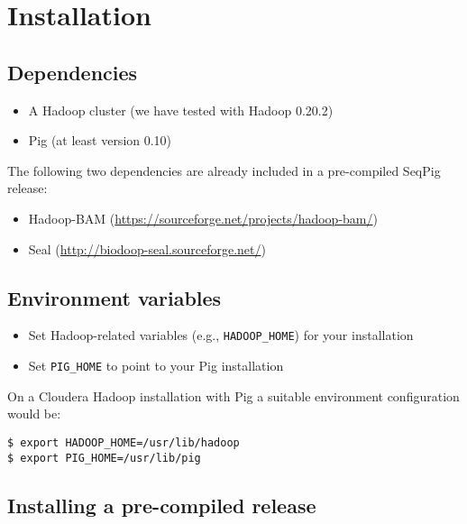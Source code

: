 
\section{Installation}



\subsection{Dependencies}

\begin{itemize}
	\item A Hadoop cluster (we have tested with Hadoop 0.20.2)
	\item Pig (at least version 0.10)
\end{itemize}
%
The following two dependencies are already included in a pre-compiled SeqPig release:
\begin{itemize}
\item Hadoop-BAM (\url{https://sourceforge.net/projects/hadoop-bam/})
\item Seal (\url{http://biodoop-seal.sourceforge.net/})
\end{itemize}

\subsection{Environment variables}
\label{sect:install_env}
\begin{itemize}
\item Set Hadoop-related variables (e.g., {\tt HADOOP\_HOME}) for your
	installation
\item Set {\tt PIG\_HOME} to point to your Pig installation
\end{itemize}

On a Cloudera Hadoop installation with Pig a suitable environment configuration would be:
\begin{lstlisting} 
$ export HADOOP_HOME=/usr/lib/hadoop
$ export PIG_HOME=/usr/lib/pig
\end{lstlisting}

\subsection{Installing a pre-compiled release}

